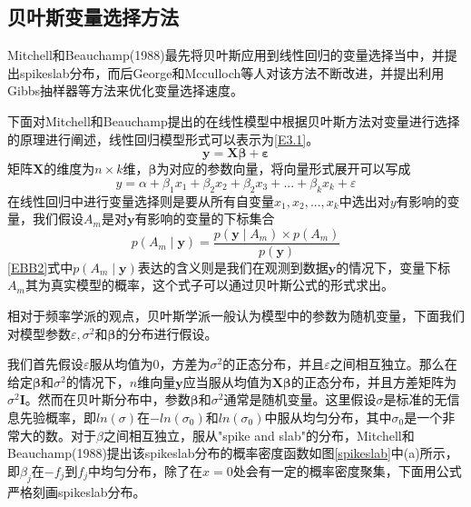 \documentclass[12pt]{article} %
\begin{document}
	
	\subsection{贝叶斯变量选择方法 \label{S3.1}}
	Mitchell和Beauchamp(1988)最先将贝叶斯应用到线性回归的变量选择当中\cite{mitchell1988bayesian}，并提出spikeslab分布，而后George和Mcculloch等人对该方法不断改进，并提出利用Gibbs抽样器等方法来优化变量选择速度\cite{george1993variable,ishwaran2005spike}。
	
	下面对Mitchell和Beauchamp提出的在线性模型中根据贝叶斯方法对变量进行选择的原理进行阐述\cite{mitchell1988bayesian}，线性回归模型形式可以表示为\eqref{E3.1}。
	\begin{equation}
		\mathbf{y}=\mathbf{X} \boldsymbol{\beta} + \boldsymbol{ \varepsilon} \label{E3.1}
	\end{equation}
	矩阵$\mathbf{X}$的维度为$n\times k$维，$\boldsymbol{\beta} $为对应的参数向量，将向量形式展开可以写成
	\begin{equation*}
		y= \alpha + \beta_1 x_1 + \beta_2 x_2 + \beta_2 x_3 +...+\beta_k x_k + \varepsilon
	\end{equation*}
	在线性回归中进行变量选择则是要从所有自变量$x_1,x_2,...,x_k$中选出对$y$有影响的变量，我们假设$A_m$是对$\mathbf{y}$有影响的变量的下标集合
	\begin{equation}
		p(A_m \mid \mathbf{y})=\dfrac{p(\mathbf{y} \mid A_m) \times p(A_m)}{p(\mathbf{y})} \label{EBB2}
	\end{equation}
	\eqref{EBB2}式中$p(A_m \mid \mathbf{y})$表达的含义则是我们在观测到数据$\mathbf{y}$的情况下，变量下标$A_m$其为真实模型的概率，这个式子可以通过贝叶斯公式的形式求出。
	
	
	相对于频率学派的观点，贝叶斯学派一般认为模型中的参数为随机变量，下面我们对模型参数$\varepsilon, \sigma^2$和$\boldsymbol{\beta}$的分布进行假设。
	
	我们首先假设$\varepsilon$服从均值为0，方差为$\sigma^2$的正态分布，并且$\varepsilon$之间相互独立。那么在给定$\boldsymbol{\beta}$和$\sigma^2$的情况下，$n$维向量$\mathbf{y}$应当服从均值为$\mathbf{X} \boldsymbol{\beta} $的正态分布，并且方差矩阵为$\sigma^2 \mathbf{I}$。然而在贝叶斯分布中，参数$\boldsymbol{\beta}$和$\sigma^2$通常是随机变量。这里假设$\sigma$是标准的无信息先验概率，即$ln(\sigma)$在$-ln(\sigma_0)$和$ln(\sigma_0)$中服从均匀分布，其中$\sigma_0$是一个非常大的数。对于$\beta$之间相互独立，服从"spike and slab"的分布，Mitchell和Beauchamp(1988)提出该spikeslab分布的概率密度函数如图\ref{spikeslab}中(a)所示，即$\beta_j$在$-f_j$到$f_j$中均匀分布，除了在$x=0$处会有一定的概率密度聚集，下面用公式严格刻画spikeslab分布。
	
\end{document}
